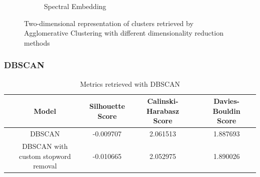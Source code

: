 \begin{figure}
\begin{subfigure}{.3\textwidth}
    \caption{Spectral Embedding}
    \label{fig:agglomerative_spectral}
  \end{subfigure}
  \caption{Two-dimensional representation of clusters retrieved by Agglomerative Clustering with different dimensionality reduction methods}
  \label{fig:agglomerative}
\end{figure}

\subsubsection{DBSCAN}

\begin{table}[]
  \centering
  \begin{tabular}{c|c|c|c}
    Model &  \shortstack[c]{Silhouette \\ Score} & \shortstack[c]{Calinski-Harabasz \\ Score} &  \shortstack[c]{Davies-Bouldin \\ Score}  \\
    \hline
    \hline
    DBSCAN & -0.009707 & 2.061513 & 1.887693 \\
    \hline
    \shortstack[c]{DBSCAN with \\ custom stopword removal} & -0.010665 & 2.052975 & 1.890026 \\
   \end{tabular}
  \caption{Metrics retrieved with DBSCAN}
  \label{tab:scores_dbscan}
\end{table}

